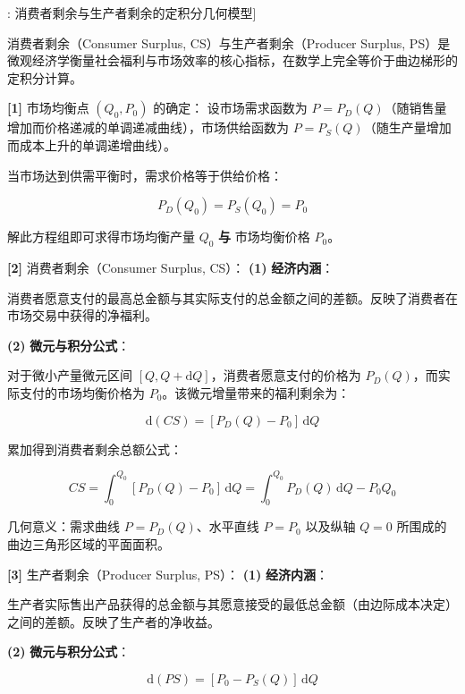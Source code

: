 \documentclass[11pt,a4paper,UTF8]{ctexart}
\begin{document}
\begin{thmbox}[模型[7]: 消费者剩余与生产者剩余的定积分几何模型]

消费者剩余（Consumer Surplus, CS）与生产者剩余（Producer Surplus, PS）是微观经济学衡量社会福利与市场效率的核心指标，在数学上完全等价于曲边梯形的定积分计算。

\textbf{[1]} 市场均衡点 $(Q_0, P_0)$ 的确定：
设市场需求函数为 $P = P_D(Q)$（随销售量增加而价格递减的单调递减曲线），市场供给函数为 $P = P_S(Q)$（随生产量增加而成本上升的单调递增曲线）。

当市场达到供需平衡时，需求价格等于供给价格：


\begin{equation*}
P_D(Q_0) = P_S(Q_0) = P_0
\end{equation*}


解此方程组即可求得\textit{}市场均衡产量 $Q_0$\textbf{ 与 }市场均衡价格 $P_0$\textit{}。

\textbf{[2]} 消费者剩余（Consumer Surplus, CS）：
\textbf{(1)}  \textbf{经济内涵}：

消费者愿意支付的最高总金额与其实际支付的总金额之间的差额。反映了消费者在市场交易中获得的净福利。

\textbf{(2)}  \textbf{微元与积分公式}：

对于微小产量微元区间 $[Q, Q + \mathrm{d}Q]$，消费者愿意支付的价格为 $P_D(Q)$，而实际支付的市场均衡价格为 $P_0$。该微元增量带来的福利剩余为：


\begin{equation*}
\mathrm{d}(CS) = [P_D(Q) - P_0]\,\mathrm{d}Q
\end{equation*}


累加得到消费者剩余总额公式：


\begin{equation*}
CS = \int_0^{Q_0} [P_D(Q) - P_0]\,\mathrm{d}Q = \int_0^{Q_0} P_D(Q)\,\mathrm{d}Q - P_0 Q_0
\end{equation*}


几何意义：需求曲线 $P = P_D(Q)$、水平直线 $P = P_0$ 以及纵轴 $Q = 0$ 所围成的曲边三角形区域的平面面积。

\textbf{[3]} 生产者剩余（Producer Surplus, PS）：
\textbf{(1)}  \textbf{经济内涵}：

生产者实际售出产品获得的总金额与其愿意接受的最低总金额（由边际成本决定）之间的差额。反映了生产者的净收益。

\textbf{(2)}  \textbf{微元与积分公式}：


\begin{equation*}
\mathrm{d}(PS) = [P_0 - P_S(Q)]\,\mathrm{d}Q
\end{equation*}



\end{thmbox}
\end{document}
